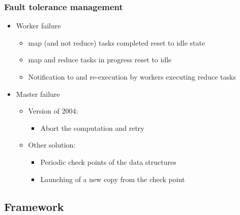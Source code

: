 \begin{frame}
\frametitle{Fault tolerance management}
\begin{itemize}
  \item Worker failure
      \begin{itemize}
      \item map (and not reduce) tasks completed reset to idle state
      \item map and reduce tasks in progress reset to idle
      \item Notification to and re-execution by workers executing reduce tasks
      \end{itemize}

  \item Master failure
  \begin{itemize}
      \item Version of 2004: 
      \begin{itemize}
      \item Abort the computation and retry
      \end{itemize}
      \item Other solution: 
      \begin{itemize}
      \item Periodic check points of the data structures 
      \item Launching of a new copy from the check point 
      \end{itemize}
      \end{itemize}
\end{itemize}
  



\end{frame}

\subsection{Framework}

